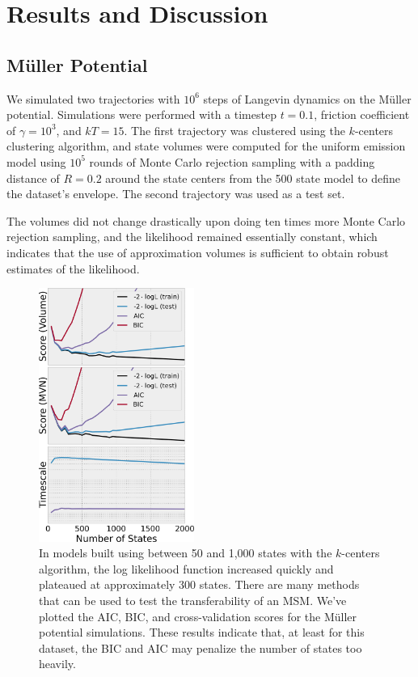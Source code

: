 \documentclass[twocolumn,floatfix,nofootinbib,aps]{revtex4-1}
\begin{document}
\section{Results and Discussion}
\subsection{M\"{u}ller Potential}
We simulated two trajectories with $10^6$ steps of Langevin dynamics on the M\"{u}ller potential\cite{}. Simulations were performed with a timestep $t=0.1$, friction coefficient of $\gamma=10^3$, and $kT=15$. The first trajectory was clustered using the $k$-centers clustering algorithm, and state volumes were computed for the uniform emission model using $10^5$ rounds of Monte Carlo rejection sampling with a padding distance of $R=0.2$ around the state centers from the 500 state model to define the dataset's envelope. The second trajectory was used as a test set.

The volumes did not change drastically upon doing ten times more Monte Carlo rejection sampling, and the likelihood remained essentially constant, which indicates that the use of approximation volumes is sufficient to obtain robust estimates of the likelihood. 

\begin{figure}[h]
\centering
\includegraphics[width=2in]{figs/mull_cross_vert.png}
\caption{In models built using between 50 and 1,000 states with the $k$-centers algorithm, the log likelihood function increased quickly and plateaued at approximately 300 states. There are many methods that can be used to test the transferability of an MSM. We've plotted the AIC, BIC, and cross-validation scores for the M\"uller potential simulations. These results indicate that, at least for this dataset, the BIC and AIC may penalize the number of states too heavily.}
\label{fig:mullerlike}
\end{figure}
\end{document}
